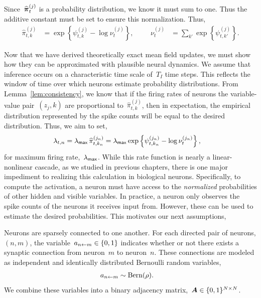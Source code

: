 Since~$\widehat{\boldsymbol{\pi}}_{t}^{(j)}$ is a probability distribution, we
know it must sum to one. Thus the additive constant must be set to
ensure this normalization.  Thus,
\begin{align}
  \widehat{\pi}_{t,k}^{(j)} &=
  \exp \left \{\psi_{t,k}^{(j)} -\log \nu_{t}^{(j)} \right \},
  & & &
  \nu_t^{(j)} &= \sum_{k'} \exp \left \{\psi_{t,k'}^{(j)} \right \}.
\end{align}


Now that we have derived theoretically exact mean field updates, we
must show how they can be approximated with plausible neural dynamics.
We assume that inference occurs on a characteristic time scale of~$T_I$
time steps. This reflects the window of time over which neurons estimate
probability distributions.
From Lemma~\ref{lem:consistency}, we know that if the firing rates of
neurons the variable-value pair~${(z_j,k)}$ are proportional
to~$\widehat{\pi}_{t,k}^{(j)}$, then in expectation, the empirical
distribution represented by the spike counts will be equal to the
desired distribution. Thus, we aim to set,
\begin{align}
  \lambda_{t,n} &= \lambda_{\mathsf{max}} \, \widehat{\pi}_{t,k_n}^{(j_n)}
  = \lambda_{\mathsf{max}} \exp \left \{\psi_{t,k_n}^{(j_n)} -\log \nu_{t}^{(j_n)} \right \},
\end{align}
for maximum firing rate,~$\lambda_{\mathsf{max}}$. While this rate function is
nearly a linear-nonlinear cascade, as we studied in previous
chapters, there is one major impediment to realizing this
calculation in biological neurons. Specifically, to compute
the activation, a neuron must have access to the \emph{normalized}
probabilities of other hidden and visible variables. In practice,
a neuron only observes the spike counts of the neurons it receives 
input from. However, these can be used to estimate the desired probabilities.
This motivates our next assumptions,

\begin{assumption}
  Neurons are sparsely connected to one another. For each directed
  pair of neurons, $(n,m)$, the variable~$a_{n \leftarrow m} \in \{0,1\}$
  indicates whether or not there exists a synaptic connection from
  neuron~$m$ to neuron~$n$. These connections are modeled as
  independent and identically distributed Bernoulli random variables,
  \begin{align}
    a_{n \leftarrow m} &\sim \mathrm{Bern}(\rho).
  \end{align}
  We combine these variables into a binary adjacency 
  matrix,~$\boldsymbol{A} \in \{0,1\}^{N \times N}$.
\end{assumption}

